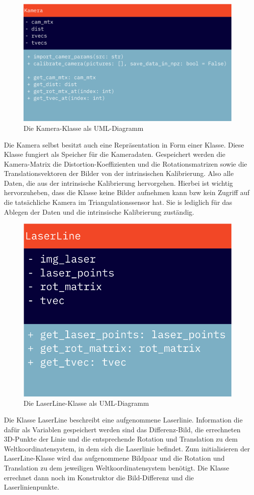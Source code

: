 		\begin{figure}[h]
			\centering
			\includegraphics[width=0.7\linewidth]{img/hauptteil/software/Kamera_UML.png}
			\caption{Die Kamera-Klasse als UML-Diagramm}
			\label{fig:kamera_uml}
		\end{figure}
		Die Kamera selbst besitzt auch eine Repräsentation in Form einer Klasse. Diese Klasse fungiert als Speicher für die Kameradaten. Gespeichert werden die Kamera-Matrix die Distortion-Koeffizienten und die Rotationsmatrizen sowie die Translationsvektoren der Bilder von der intrinsischen Kalibrierung. Also alle Daten, die aus der intrinsische Kalibrierung hervorgehen. Hierbei ist wichtig hervorzuheben, dass die Klasse keine Bilder aufnehmen kann bzw kein Zugriff auf die tatsächliche Kamera im Triangulationssensor hat. Sie is lediglich für das Ablegen der Daten und die intrinsische Kalibrierung zuständig.
		\newpage
		\begin{figure}[h]
			\centering
			\includegraphics[width=0.35\linewidth]{img/hauptteil/software/LaserLine_UML.png}
			\caption{Die LaserLine-Klasse als UML-Diagramm}
			\label{fig:laser_line_uml}
		\end{figure}
		Die Klasse LaserLine beschreibt eine aufgenommene Laserlinie. Information die dafür als Variablen gespeichert werden sind das Differenz-Bild, die errechneten 3D-Punkte der Linie und die entsprechende Rotation und Translation zu dem Weltkoordinatensystem, in dem sich die Laserlinie befindet. Zum initialisieren der LaserLine-Klasse wird das aufgenommene Bildpaar und die Rotation und Translation zu dem jeweiligen Weltkoordinatensystem benötigt. Die Klasse errechnet dann noch im Konstruktor die Bild-Differenz und die Laserlinienpunkte.
		

